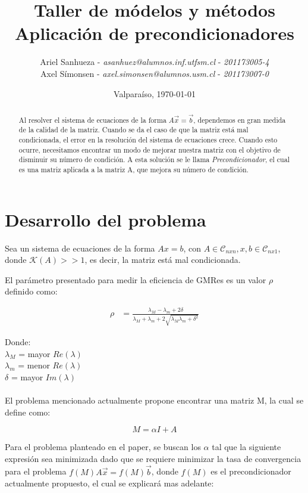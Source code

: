 \documentclass[fleqn]{article}
\title{\textbf{Taller de módelos y métodos}\\Aplicación de precondicionadores}
\author{Ariel Sanhueza - \textit{asanhuez@alumnos.inf.utfsm.cl} - \textit{201173005-4}\\
{Axel Símonsen - \textit{axel.simonsen@alumnos.usm.cl} - \textit{201173007-0}}}
\date{\vspace*{1cm} Valparaíso, \today}
\begin{document}
\maketitle

\begin{abstract}
Al resolver el sistema de ecuaciones de la forma $A\vec{x}=\vec{b}$, dependemos en gran medida de la calidad de la matriz. Cuando se da el caso de que la matriz está mal condicionada, el error en la resolución del sistema de ecuaciones crece. Cuando esto ocurre, necesitamos encontrar un modo de mejorar nuestra matriz con el objetivo de disminuir su número de condición. A esta solución se le llama \emph{Precondicionador}, el cual es una matriz aplicada a la matriz A, que mejora su número de condición.  
\end{abstract}

\section{Desarrollo del problema}

Sea un sistema de ecuaciones de la forma $Ax = b$, con $A \in \mathcal{C}_{nxn}, x, b \in \mathcal{C}_{nx1}$, donde $\mathcal{K}(A) >> 1$, es decir, la matriz está mal condicionada.

El parámetro presentado para medir la eficiencia de GMRes es un valor $\rho$ definido como:

\begin{align*}
\rho &= \frac{\lambda_M - \lambda_m + 2\delta}{\lambda_M + \lambda_m + 2\sqrt{\lambda_M \lambda_m + \delta^2}}
\end{align*}

Donde:\\
$\lambda_{M}$ = mayor $Re(\lambda)$\\
$\lambda_{m}$ = menor $Re(\lambda)$\\
$\delta$ = mayor $Im(\lambda)$\\
\\

El problema mencionado actualmente propone encontrar una matriz M, la cual se define como:


\begin{equation}
 M= \alpha I + A 
\end{equation}

\newpage
Para el problema planteado en el paper, se buscan los $\alpha$ tal que la siguiente expresión sea minimizada dado que se requiere minimizar la tasa de convergencia para el problema $f(M)A\vec{x} = f(M)\vec{b}$, donde $f(M)$ es el precondicionador actualmente propuesto, el cual se explicará mas adelante:
\end{document}
